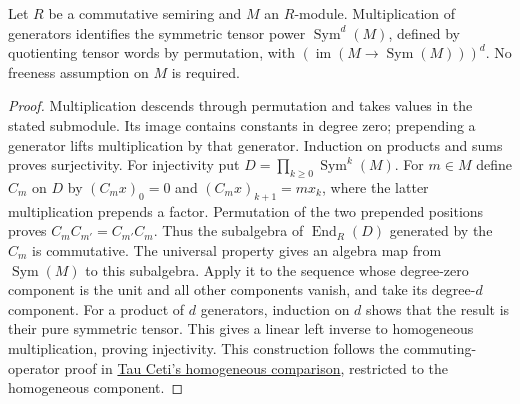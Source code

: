 \begin{lemma}
\label{lem:symmetric-power-homogeneous}
\leanok
Let $R$ be a commutative semiring and $M$ an $R$-module. Multiplication
of generators identifies the symmetric tensor power $\operatorname{Sym}^d(M)$,
defined by quotienting tensor words by permutation, with
$(\operatorname{im}(M\to\operatorname{Sym}(M)))^d$.
No freeness assumption on $M$ is required.
\end{lemma}
\begin{proof}
Multiplication descends through permutation and takes values in the stated
submodule. Its image contains constants in degree zero; prepending a
generator lifts multiplication by that generator. Induction on products
and sums proves surjectivity.
For injectivity put $D=\prod_{k\ge0}\operatorname{Sym}^k(M)$. For $m\in M$
define $C_m$ on $D$ by $(C_mx)_0=0$ and
$(C_mx)_{k+1}=m x_k$, where the latter multiplication prepends a factor.
Permutation of the two prepended positions proves $C_mC_{m'}=C_{m'}C_m$.
Thus the subalgebra of $\operatorname{End}_R(D)$ generated by the $C_m$
is commutative. The universal property gives an algebra map from
$\operatorname{Sym}(M)$ to this subalgebra. Apply it to the sequence
whose degree-zero component is the unit and all other components vanish,
and take its degree-$d$ component. For a product of $d$ generators,
induction on $d$ shows that the result is their pure symmetric tensor.
This gives a linear left inverse to homogeneous multiplication, proving
injectivity. This construction follows the commuting-operator proof in
\href{https://github.com/TauCetiProject/TauCeti/blob/3c3a32baea963db05c302adeb307b22baae4de78/TauCeti/LinearAlgebra/SymmetricPower/Algebra.lean}{Tau Ceti's homogeneous comparison},
restricted to the homogeneous component.
\end{proof}

